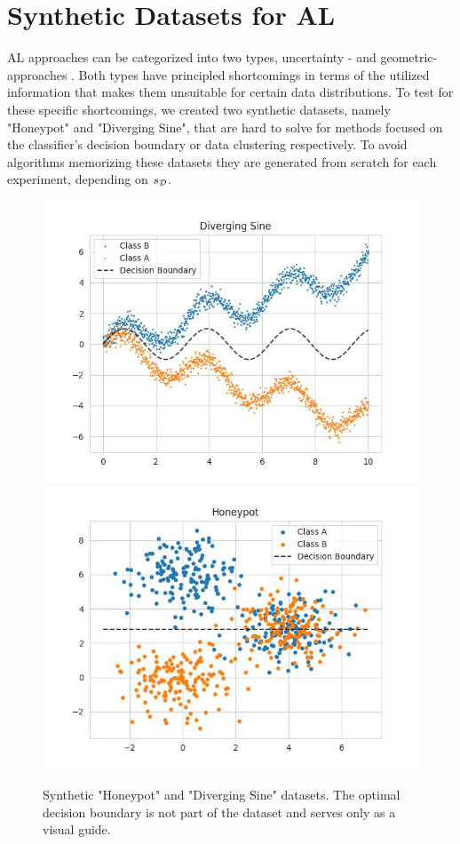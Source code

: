 \section{Synthetic Datasets for AL}

AL approaches can be categorized into two types, uncertainty \cite{wang2014new, gal2017deep} - and geometric-approaches \cite{sener2017active, hacohen2022active, ashdeep}. Both types have principled shortcomings in terms of the utilized information that makes them unsuitable for certain data distributions. To test for these specific shortcomings, we created two synthetic datasets, namely "Honeypot" and "Diverging Sine", that are hard to solve for methods focused on the classifier's decision boundary or data clustering respectively. 
To avoid algorithms memorizing these datasets they are generated from scratch for each experiment, depending on $s_{\mathcal{D}}$. \\
\begin{figure}[H]
	\centering
	\includegraphics[width=0.4\linewidth]{img/diverging_sin.jpg}
	\includegraphics[width=0.4\linewidth]{img/honeypot.jpg}
	\caption{Synthetic "Honeypot" and "Diverging Sine" datasets. The optimal decision boundary is not part of the dataset and serves only as a visual guide.}
	\label{fig:synthDataAppendix}
\end{figure}

